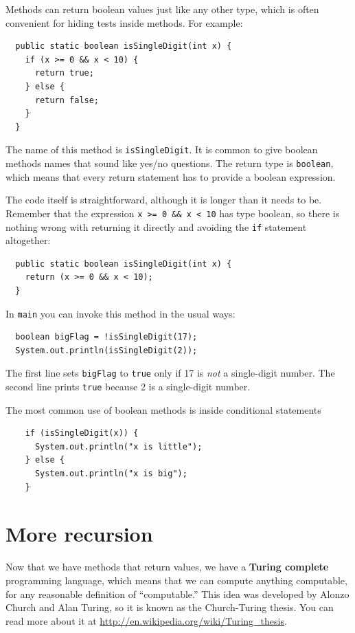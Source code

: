 Methods can return boolean values just like any other type,
which is often convenient for hiding tests inside
methods.  For example:

\begin{lstlisting}
  public static boolean isSingleDigit(int x) {
    if (x >= 0 && x < 10) {
      return true;
    } else {
      return false;
    }
  }
\end{lstlisting}
%
The name of this method is {\tt isSingleDigit}.  It is common
to give boolean methods names that sound like yes/no questions.
The return type is {\tt boolean}, which means that every return
statement has to provide a boolean expression.

The code itself is straightforward, although it is longer than
it needs to be.  Remember that the expression {\tt x >= 0 \&\& x < 10}
has type boolean, so there is nothing wrong with returning it
directly and avoiding the {\tt if} statement altogether:

\begin{lstlisting}
  public static boolean isSingleDigit(int x) {
    return (x >= 0 && x < 10);
  }
\end{lstlisting}
%
In {\tt main} you can invoke this method in the usual ways:

\begin{lstlisting}
  boolean bigFlag = !isSingleDigit(17);
  System.out.println(isSingleDigit(2));
\end{lstlisting}
%
The first line sets {\tt bigFlag} to {\tt true}
only if 17 is {\em not} a single-digit number.  The second
line prints {\tt true} because 2 is a single-digit number.

The most common use of boolean methods is inside conditional
statements

\begin{lstlisting}
    if (isSingleDigit(x)) {
      System.out.println("x is little");
    } else {
      System.out.println("x is big");
    }
\end{lstlisting}


\section {More recursion}
\label{factorial}

Now that we have methods that return values, we have a {\bf Turing
  complete} programming language, which means that we can compute
anything computable, for any reasonable definition of ``computable.''
%
This idea was developed by Alonzo Church and Alan Turing, so it is
known as the Church-Turing thesis.  You can read more about it at
\url{http://en.wikipedia.org/wiki/Turing_thesis}.

